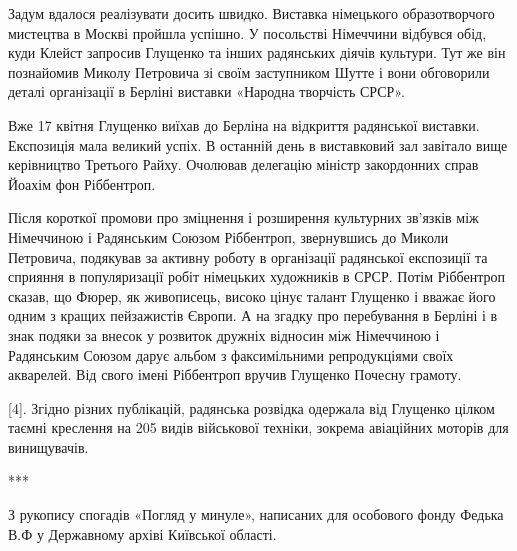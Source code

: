 Задум вдалося реалізувати досить швидко. Виставка німецького образотворчого
мистецтва в Москві пройшла успішно. У посольстві Німеччини відбувся обід, куди
Клейст запросив Глущенко та інших радянських діячів культури. Тут же він
познайомив Миколу Петровича зі своїм заступником Шутте і вони обговорили деталі
організації в Берліні виставки «Народна творчість СРСР».

Вже 17 квітня Глущенко виїхав до Берліна на відкриття радянської виставки.
Експозиція мала великий успіх. В останній день в виставковий зал завітало вище
керівництво Третього Райху. Очолював делегацію міністр закордонних справ Йоахім
фон Ріббентроп. 

Після короткої промови про зміцнення і розширення культурних зв'язків між
Німеччиною і Радянським Союзом Ріббентроп, звернувшись до Миколи Петровича,
подякував за активну роботу в організації радянської експозиції та сприяння в
популяризації робіт німецьких художників в СРСР. Потім Ріббентроп сказав, що
Фюрер, як живописець, високо цінує талант Глущенко і вважає його одним з кращих
пейзажистів Європи. А на згадку про перебування в Берліні і в знак подяки за
внесок у розвиток дружніх відносин між Німеччиною і Радянським Союзом дарує
альбом з факсимільними репродукціями своїх акварелей. Від свого імені
Ріббентроп вручив Глущенко Почесну грамоту.

[4]. Згідно різних публікацій, радянська розвідка одержала від Глущенко цілком
таємні креслення на 205 видів військової техніки, зокрема авіаційних моторів
для винищувачів.

***

З рукопису спогадів «Погляд у минуле», написаних для особового фонду Федька В.Ф
у Державному архіві Київської області.
